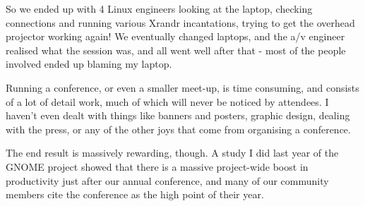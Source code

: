 So we ended up with 4 Linux engineers looking at the laptop, checking
connections and running various Xrandr incantations, trying to get the
overhead projector working again! We eventually changed laptops, and the
a/v engineer realised what the session was, and all went well after that
- most of the people involved ended up blaming my laptop.

Running a conference, or even a smaller meet-up, is time consuming, and
consists of a lot of detail work, much of which will never be noticed by
attendees. I haven't even dealt with things like banners and posters,
graphic design, dealing with the press, or any of the other joys that
come from organising a conference.

The end result is massively rewarding, though. A study I did last year
of the GNOME project showed that there is a massive project-wide boost
in productivity just after our annual conference, and many of our
community members cite the conference as the high point of their year.
